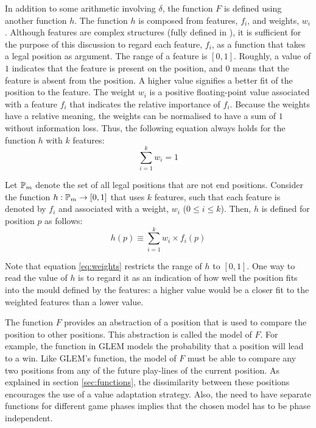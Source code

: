 In addition to some arithmetic involving $\delta$, the function $F$ is defined using another function $h$. The function $h$ is composed from features, $f_i$, and weights, $w_i$.   Although features are complex structures (fully defined in  ), it is sufficient for the purpose of this discussion to regard each feature, $f_i$, as a function that takes a legal position as argument.  The range of a feature is $[0,1]$.  Roughly, a value of $1$ indicates that the feature is present on the position, and $0$ means that the feature is absent from the position.   A higher value signifies a better fit of the position to the feature.  The weight $w_i$ is a positive floating-point value associated with a feature $f_i$ that indicates the relative importance of $f_i$. Because the weights have a relative meaning, the weights can be normalised to have a sum of $1$ without information loss.  Thus, the following equation always holds for the function $h$ with $k$ features:
\begin{equation}
\sum_{i=1}^k w_i = 1
\label{eq:weights}
\end{equation}

Let $\mathbb{P}_m$ denote the set of all legal positions that are not end positions. Consider the function $h : \mathbb{P}_m \rightarrow [0,1]$ that uses $k$ features, such that each feature is denoted by $f_i$ and associated with a weight,  $w_i$  ($0 \leq i \leq k$). Then, $h$ is defined for position $p$ as follows:
\begin{equation}
h(p) \equiv \sum_{i=1}^k w_i \times f_i(p)  
\label{eq:smallf}
\end{equation}

Note that equation \ref{eq:weights} restricts the range of $h$ to $[0,1]$.  One way to read the value of $h$ is to regard it as an indication of how well the position fits into the mould defined by the features: a higher value would be a closer fit to the weighted  features than a lower value.   

The function $F$ provides an abstraction of a position that is used to compare the position to other positions.  This abstraction is called the model of $F$. For example, the function in GLEM models the probability that a position will lead to a win. Like GLEM's function, the model of $F$ must be able to compare any two positions from any of the future play-lines of the current position. As explained in section \ref{sec:functions}, the dissimilarity between these positions encourages the use of a value adaptation strategy. Also, the need to have separate functions  for different game phases implies that the chosen model has to be phase independent.

